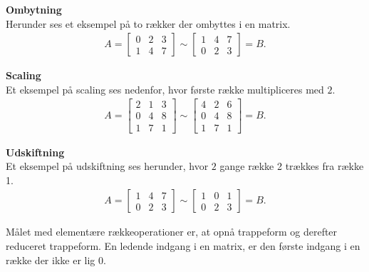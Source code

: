 \begin{eks}[Rækkeoperationer]
\textbf{Ombytning}\\
Herunder ses et eksempel på to rækker der ombyttes i en matrix.\\

\begin{align*}
A= \begin{bmatrix}
0 & 2 & 3 \\
1 & 4 & 7
\end{bmatrix}
\sim \begin{bmatrix}
1 & 4 & 7 \\
0 & 2 & 3
\end{bmatrix} = B.
\end{align*}

\textbf{Scaling} \\
Et eksempel på scaling ses nedenfor, hvor første række multipliceres med $2$.\\

\begin{align*}
A= \begin{bmatrix}
2 & 1 & 3 \\
0 & 4 & 8 \\
1 & 7 & 1
\end{bmatrix}
\sim \begin{bmatrix}
4 & 2 & 6 \\
0 & 4 & 8 \\
1 & 7 & 1
\end{bmatrix} = B.
\end{align*}

\textbf{Udskiftning}\\
Et eksempel på udskiftning ses herunder, hvor $2$ gange række 2 trækkes fra række 1.\\

\begin{align*}
A= \begin{bmatrix}
1 & 4 & 7 \\
0 & 2 & 3
\end{bmatrix}
\sim \begin{bmatrix}
1 & 0 & 1 \\
0 & 2 & 3
\end{bmatrix} = B.
\end{align*}
\end{eks}

Målet med elementære rækkeoperationer er, at opnå trappeform og derefter reduceret trappeform. En ledende indgang i en matrix, er den første indgang i en række der ikke er lig 0. 

